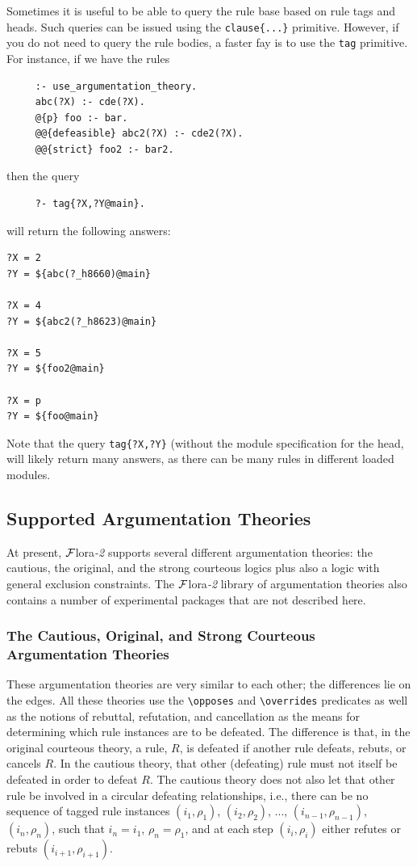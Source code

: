 \documentclass[11pt]{article}
\newcommand{\FLORA}{{\mbox{\sc ${\cal F}${lora}\rm\emph{-2}}}\xspace}
\newcommand{\FLSYSTEM}{\FLORA}
\newcommand{\bs}{\textbackslash}
\begin{document}
Sometimes it is useful to be able to query the rule base based on rule
tags and heads. Such queries can be issued
using the {\tt clause\{...\}} primitive. However, 
if you do not need to query the rule bodies, a faster fay is to use the
{\tt tag}  primitive. For instance, if we have
the rules
\begin{verbatim}
     :- use_argumentation_theory.
     abc(?X) :- cde(?X).
     @{p} foo :- bar.
     @@{defeasible} abc2(?X) :- cde2(?X).
     @@{strict} foo2 :- bar2.
\end{verbatim}
then the query
\begin{verbatim}
     ?- tag{?X,?Y@main}.
\end{verbatim}
will return the following answers:
\begin{verbatim}
?X = 2
?Y = ${abc(?_h8660)@main}

?X = 4
?Y = ${abc2(?_h8623)@main}

?X = 5
?Y = ${foo2@main}

?X = p
?Y = ${foo@main}
\end{verbatim}
Note that the query \texttt{tag\{?X,?Y\}} (without the module specification
for the head, will likely return many answers, as there can be many rules
in different loaded modules. 


\subsection{Supported Argumentation Theories}\label{sec-exclusion-constr}

At present, \FLSYSTEM supports several different argumentation theories: the
cautious,
the original, and the strong courteous logics plus also a
logic with general exclusion constraints. The \FLSYSTEM library of
argumentation theories also contains a number of
experimental packages that are not described here.

\subsubsection{The Cautious, Original, and Strong Courteous Argumentation Theories}

These argumentation theories are very similar to each other; the
differences lie on the edges. All these theories use the {\tt \bs{}opposes} and
{\tt \bs{}overrides} predicates as well as the notions of rebuttal,
refutation, and cancellation as the means for determining which rule
instances are to be defeated. The difference is that, in the original courteous
theory, a rule, $R$, is defeated if another rule defeats, rebuts, or
cancels $R$.
In the cautious theory, that other (defeating)
rule must not itself be defeated in order to
defeat $R$. The cautious theory does not also let that other rule be
involved in a circular defeating relationships,
i.e., there can be no sequence of
  tagged rule instances $(i_1,\rho_1)$, $(i_2,\rho_2)$, ...,
  $(i_{n-1},\rho_{n-1})$, $(i_n,\rho_n)$, such that $i_n=i_1$,
  $\rho_n=\rho_1$, and at each step $(i_i,\rho_i)$ either refutes or rebuts
  $(i_{i+1},\rho_{i+1})$.
\end{document}
